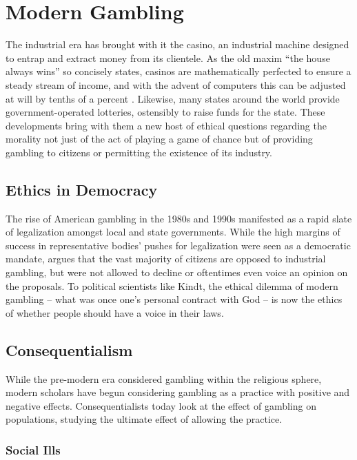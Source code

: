 \documentclass{../../../coursework}
\begin{document}
\section{Modern Gambling}

The industrial era has brought with it the casino, an industrial machine designed to entrap and extract money from its clientele. As the old maxim ``the house always wins'' so concisely states, casinos are mathematically perfected to ensure a steady stream of income, and with the advent of computers this can be adjusted at will by tenths of a percent \parencite{Kin98}. Likewise, many states around the world provide government-operated lotteries, ostensibly to raise funds for the state. These developments bring with them a new host of ethical questions regarding the morality not just of the act of playing a game of chance but of providing gambling to citizens or permitting the existence of its industry.

\subsection{Ethics in Democracy}

The rise of American gambling in the 1980s and 1990s manifested as a rapid slate of legalization amongst local and state governments. While the high margins of success in representative bodies' pushes for legalization were seen as a democratic mandate, \textcite{Kin98} argues that the vast majority of citizens are opposed to industrial gambling, but were not allowed to decline or oftentimes even voice an opinion on the proposals. To political scientists like Kindt, the ethical dilemma of modern gambling -- what was once one's personal contract with God -- is now the ethics of whether people should have a voice in their laws.

\subsection{Consequentialism}

While the pre-modern era considered gambling within the religious sphere, modern scholars have begun considering gambling as a practice with positive and negative effects. Consequentialists today look at the effect of gambling on populations, studying the ultimate effect of allowing the practice.

\subsubsection{Social Ills}
\end{document}
